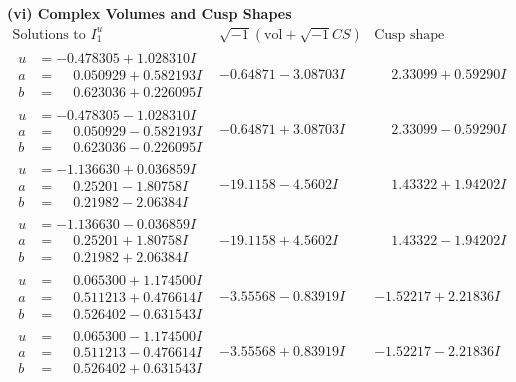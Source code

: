 \documentclass[1p]{elsarticle_modified}
\theoremstyle{definition}
\newcommand{\I}{\sqrt{-1}}
\begin{document}
\newpage\flushleft \textbf{(vi) Complex Volumes and Cusp Shapes}
$$\begin{array}{c|c|c}  
\text{Solutions to }I^u_{1}& \I (\text{vol} + \sqrt{-1}CS) & \text{Cusp shape}\\
 \hline 
\begin{aligned}
u &= -0.478305 + 1.028310 I \\
a &= \phantom{-}0.050929 + 0.582193 I \\
b &= \phantom{-}0.623036 + 0.226095 I\end{aligned}
 & -0.64871 - 3.08703 I & \phantom{-}2.33099 + 0.59290 I \\ \hline\begin{aligned}
u &= -0.478305 - 1.028310 I \\
a &= \phantom{-}0.050929 - 0.582193 I \\
b &= \phantom{-}0.623036 - 0.226095 I\end{aligned}
 & -0.64871 + 3.08703 I & \phantom{-}2.33099 - 0.59290 I \\ \hline\begin{aligned}
u &= -1.136630 + 0.036859 I \\
a &= \phantom{-}0.25201 - 1.80758 I \\
b &= \phantom{-}0.21982 - 2.06384 I\end{aligned}
 & -19.1158 - 4.5602 I & \phantom{-}1.43322 + 1.94202 I \\ \hline\begin{aligned}
u &= -1.136630 - 0.036859 I \\
a &= \phantom{-}0.25201 + 1.80758 I \\
b &= \phantom{-}0.21982 + 2.06384 I\end{aligned}
 & -19.1158 + 4.5602 I & \phantom{-}1.43322 - 1.94202 I \\ \hline\begin{aligned}
u &= \phantom{-}0.065300 + 1.174500 I \\
a &= \phantom{-}0.511213 + 0.476614 I \\
b &= \phantom{-}0.526402 - 0.631543 I\end{aligned}
 & -3.55568 - 0.83919 I & -1.52217 + 2.21836 I \\ \hline\begin{aligned}
u &= \phantom{-}0.065300 - 1.174500 I \\
a &= \phantom{-}0.511213 - 0.476614 I \\
b &= \phantom{-}0.526402 + 0.631543 I\end{aligned}
 & -3.55568 + 0.83919 I & -1.52217 - 2.21836 I \\ \hline\begin{aligned}

\end{aligned}
\end{array}$$
\end{document}

